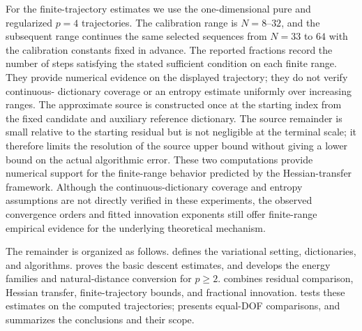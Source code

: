 For the finite-trajectory estimates we use the one-dimensional pure and regularized $p=4$
trajectories. The calibration range is $N=8$--$32$, and the subsequent range continues the same
selected sequences from $N=33$ to $64$ with the calibration constants fixed in advance. The reported
fractions record the number of steps satisfying the stated sufficient condition on each finite
range. They provide numerical evidence on the displayed trajectory; they do not verify continuous-
dictionary coverage or an entropy estimate uniformly over increasing ranges. The approximate
source is constructed once at the starting index from the fixed candidate and auxiliary reference
dictionary. The source remainder is small relative to the starting residual but is not negligible
at the terminal scale; it therefore limits the resolution of the source upper bound without giving
a lower bound on the actual algorithmic error. These two computations provide numerical support for the finite-range behavior predicted by the Hessian-transfer framework. Although the continuous-dictionary coverage and entropy assumptions are not directly verified in these experiments, the observed convergence orders and fitted innovation exponents still offer finite-range empirical evidence for the underlying theoretical mechanism.

The remainder is organized as follows.  defines the variational setting,
dictionaries, and algorithms.  proves the basic descent estimates, and
 develops the energy families and natural-distance conversion for \(p\geq2\).
 combines residual comparison, Hessian transfer, finite-trajectory
bounds, and fractional innovation.  tests these estimates on the computed
trajectories;  presents equal-DOF comparisons, and 
summarizes the conclusions and their scope.
